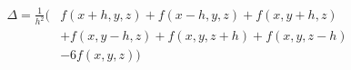 \begin{equation}
	\begin{aligned}
		\Delta = \frac{1}{h^2} \Big( 
		& f(x+h, y, z) + f(x-h, y, z) + f(x, y+h, z) \\
		& + f(x, y-h, z) + f(x, y, z+h) + f(x, y, z-h) \\
		& - 6f(x, y, z) 
		\Big)
	\end{aligned}
\end{equation}
%
%
%
%
%
%
%
%
%
